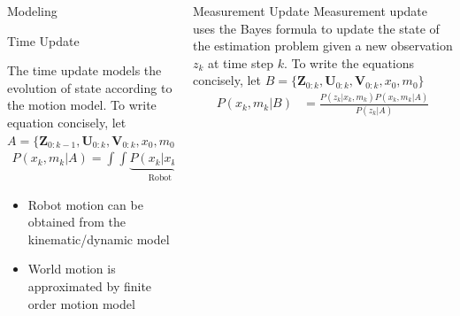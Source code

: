 \documentclass[final]{beamer}
\newlength{\sepwid}
\newlength{\onecolwid}
\begin{document}
\begin{frame}[t]
\begin{columns}[t]
\begin{column}{\onecolwid}
\begin{block}{Modeling}
      \end{block}
      \begin{block}{Time Update}

        The time update models the evolution of state according to the motion model. To write equation concisely, let $A =\{ \mathbf{Z}_{0:k-1},\mathbf{U}_{0:k},\mathbf{V}_{0:k},x_0,m_0 \}$
        \begin{multline}
          P(x_k,m_k|A) = 
          \int \int 
          \underbrace{P(x_k|x_{k-1},u_k)}_{\text{Robot motion}}
          \underbrace{P(m_k|m_{k-1},v_{k-1})}_{\text{World motion}}
          \underbrace{P(x_{k-1},m_{k-1}|A)}_{\text{Previous state}} dx_{k-1}dm_{k-1}
          \label{eq:time_update}
        \end{multline}

        \begin{itemize}
          \item
            Robot motion can be obtained from the kinematic/dynamic model 
          \item 
            World motion is approximated by finite order motion model
        \end{itemize}

      \end{block}
    \end{column}
  \hspace{-\sepwid}


      
    \begin{column}{\onecolwid}
      \begin{block} {Measurement Update} Measurement update uses the Bayes formula to update the state of the estimation problem given a new observation $z_k$ at time step $k$. To write the equations concisely, let $B =\{ \mathbf{Z}_{0:k},\mathbf{U}_{0:k},\mathbf{V}_{0:k},x_0,m_0 \}$
        \begin{align}
          P(x_k,m_k|B) %
          &=\frac{P(z_k|x_k,m_k)P(x_k,m_k|A)}{P(z_k|A)}
          \label{eq:measurement_update}
        \end{align}


\end{block}
\end{column}
\end{columns}
\end{frame}
\end{document}
